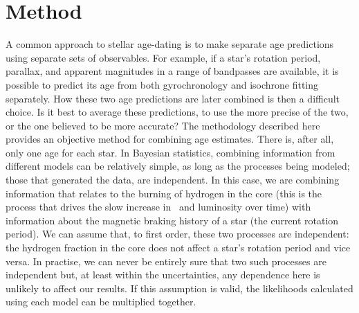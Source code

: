\section{Method}
\label{section:method}

A common approach to stellar age-dating is to make separate age predictions
using separate sets of observables.
For example, if a star's rotation period, parallax, and apparent magnitudes in
a range of bandpasses are available, it is possible to predict its age from
both gyrochronology and isochrone fitting separately.
How these two age predictions are later combined is then a difficult choice.
Is it best to average these predictions, to use the more precise of the two,
or the one believed to be more accurate?
The methodology described here provides an objective method for combining age
estimates.
There is, after all, only one age for each star.
In Bayesian statistics, combining information from different models can be
relatively simple, as long as the processes being modeled; those that
generated the data, are independent.
In this case, we are combining information that relates to the burning of
hydrogen in the core (this is the process that drives the slow increase in
\teff\ and luminosity over time) with information about the magnetic braking
history of a star (the current rotation period).
We can assume that, to first order, these two processes are independent: the
hydrogen fraction in the core does not affect a star's rotation period and
vice versa.
In practise,  we can never be entirely sure that two such processes are
independent but, at least within the uncertainties, any dependence here is
unlikely to affect our results.
If this assumption is valid, the likelihoods calculated using each model can
be multiplied together.

